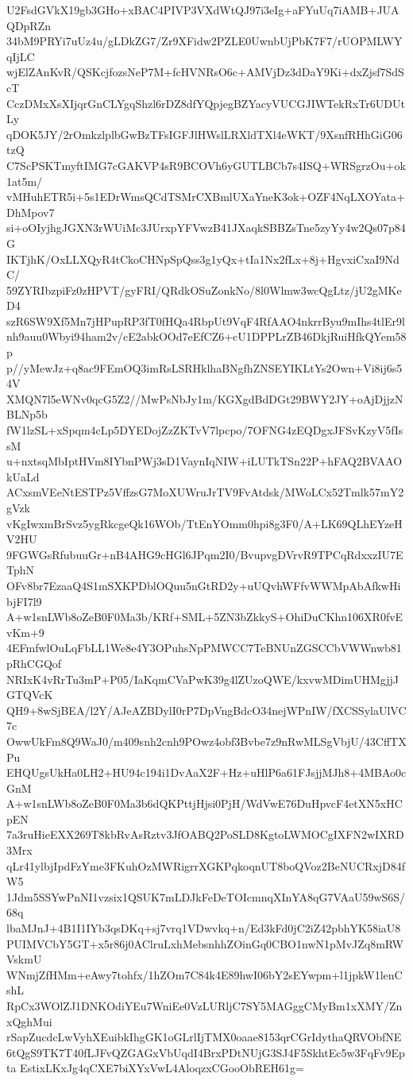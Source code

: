 U2FsdGVkX19gb3GHo+xBAC4PIVP3VXdWtQJ97i3eIg+aFYuUq7iAMB+JUAQDpRZn
34bM9PRYi7uUz4u/gLDkZG7/Zr9XFidw2PZLE0UwnbUjPbK7F7/rUOPMLWYqIjLC
wjElZAnKvR/QSKcjfozsNeP7M+fcHVNRsO6c+AMVjDz3dDaY9Ki+dxZjsf7SdScT
CczDMxXsXIjqrGnCLYgqShzl6rDZ8dfYQpjegBZYacyVUCGJIWTekRxTr6UDUtLy
qDOK5JY/2rOmkzlplbGwBzTFsIGFJlHWslLRXldTXl4eWKT/9XsnfRHhGiG06tzQ
C7ScPSKTmyftIMG7cGAKVP4sR9BCOVh6yGUTLBCb7s4ISQ+WRSgrzOu+ok1at5m/
vMHuhETR5i+5s1EDrWmsQCdTSMrCXBmlUXaYneK3ok+OZF4NqLXOYata+DhMpov7
si+oOIyjhgJGXN3rWUiMc3JUrxpYFVwzB41JXaqkSBBZsTne5zyYy4w2Qs07p84G
IKTjhK/OxLLXQyR4tCkoCHNpSpQss3g1yQx+tIa1Nx2fLx+8j+HgvxiCxaI9NdC/
59ZYRIbzpiFz0zHPVT/gyFRI/QRdkOSuZonkNo/8l0Wlmw3wcQgLtz/jU2gMKeD4
szR6SW9Xf5Mn7jHPupRP3fT0fHQa4RbpUt9VqF4RfAAO4nkrrByu9mIhs4tlEr9l
nh9auu0Wbyi94ham2v/cE2abkOOd7eEfCZ6+cU1DPPLrZB46DkjRuiHfkQYem58p
p//yMewJz+q8ac9FEmOQ3imRsLSRHklhaBNgfhZNSEYIKLtYs2Own+Vi8ij6s54V
XMQN7l5eWNv0qcG5Z2//MwPsNbJy1m/KGXgdBdDGt29BWY2JY+oAjDjjzNBLNp5b
fW1lzSL+xSpqm4cLp5DYEDojZzZKTvV7lpcpo/7OFNG4zEQDgxJFSvKzyV5fIssM
u+nxtsqMbIptHVm8IYbnPWj3sD1VaynIqNIW+iLUTkTSn22P+hFAQ2BVAAOkUaLd
ACxsmVEeNtESTPz5VffzsG7MoXUWruJrTV9FvAtdsk/MWoLCx52Tmlk57mY2gVzk
vKgIwxmBrSvz5ygRkcgeQk16WOb/TtEnYOmm0hpi8g3F0/A+LK69QLhEYzeHV2HU
9FGWGsRfubuuGr+nB4AHG9cHGl6JPqm2I0/BvupvgDVrvR9TPCqRdxxzIU7ETphN
OFv8br7EzaaQ4S1mSXKPDblOQuu5nGtRD2y+uUQvhWFfvWWMpAbAfkwHibjFI7l9
A+w1snLWb8oZeB0F0Ma3b/KRf+SML+5ZN3bZkkyS+OhiDuCKhn106XR0fvEvKm+9
4EFmfwlOuLqFbLL1We8e4Y3OPuhsNpPMWCC7TeBNUnZGSCCbVWWnwb81pRhCGQof
NRIxK4vRrTu3mP+P05/IaKqmCVaPwK39g4lZUzoQWE/kxvwMDimUHMgjjJGTQVcK
QH9+8wSjBEA/l2Y/AJeAZBDylI0rP7DpVngBdcO34nejWPnIW/fXCSSylaUlVC7c
OwwUkFm8Q9WaJ0/m409snh2cnh9POwz4obf3Bvbe7z9nRwMLSgVbjU/43CffTXPu
EHQUgsUkHa0LH2+HU94c194i1DvAaX2F+Hz+uHlP6a61FJsjjMJh8+4MBAo0cGnM
A+w1snLWb8oZeB0F0Ma3b6dQKPttjHjsi0PjH/WdVwE76DuHpvcF4etXN5xHCpEN
7a3ruHieEXX269T8kbRvAsRztv3JfOABQ2PoSLD8KgtoLWMOCgIXFN2wIXRD3Mrx
qLr41ylbjIpdFzYme3FKuhOzMWRigrrXGKPqkoqnUT8boQVoz2BeNUCRxjD84fW5
1Jdm5SSYwPnNI1vzsix1QSUK7mLDJkFeDeTOIcmnqXInYA8qG7VAaU59wS6S/68q
lbaMJnJ+4B1I1IYb3qsDKq+sj7vrq1VDwvkq+n/Ed3kFd0jC2iZ42pbhYK58iaU8
PUIMVCbY5GT+x5r86j0AClruLxhMebsnhhZOinGq0CBO1nwN1pMvJZq8mRWVskmU
WNmjZfHMm+eAwy7tohfx/1hZOm7C84k4E89hwI06bY2sEYwpm+l1jpkW1lenCshL
RpCx3WOlZJ1DNKOdiYEu7WniEe0VzLURljC7SY5MAGggCMyBm1xXMY/ZnxQghMui
rSapZucdcLwVyhXEuibkIhgGK1oGLrlIjTMX0oaae8153qrCGrIdythaQRVObfNE
6tQgS9TK7T40fLJFvQZGAGxVbUqdI4BrxPDtNUjG3SJ4F5SkhtEc5w3FqFv9Epta
EstixLKxJg4qCXE7biXYxVwL4AloqzxCGooObREH61g=
